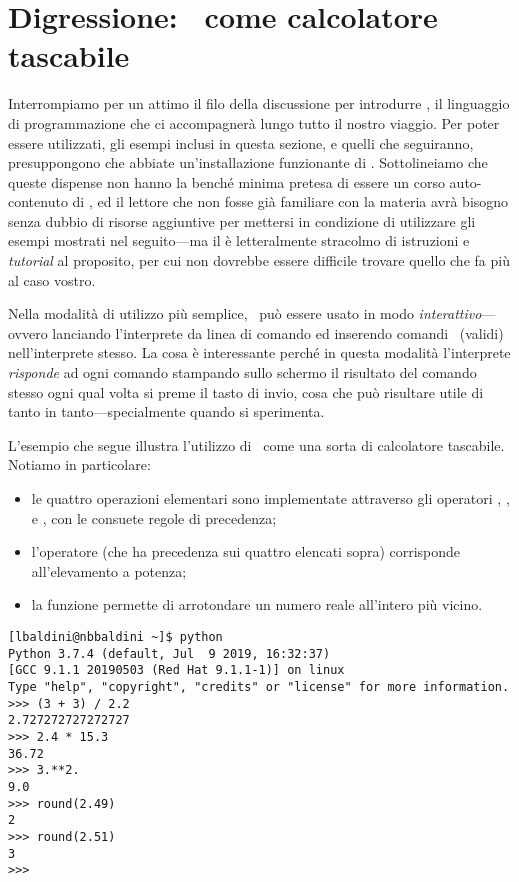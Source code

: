 \section{Digressione: \python\ come calcolatore tascabile}

Interrompiamo per un attimo il filo della discussione per introdurre \python,
il linguaggio di programmazione che ci accompagnerà lungo tutto il nostro
viaggio. Per poter essere utilizzati, gli esempi inclusi in questa sezione, e
quelli che seguiranno, presuppongono che abbiate un'installazione funzionante
di \python. Sottolineiamo che queste dispense non hanno la benché minima pretesa
di essere un corso auto-contenuto di \python, ed il lettore che non fosse già
familiare con la materia avrà bisogno senza dubbio di risorse aggiuntive per
mettersi in condizione di utilizzare gli esempi mostrati nel seguito---ma il
 è letteralmente stracolmo di istruzioni e \emph{tutorial} al
proposito, per cui non dovrebbe essere difficile trovare quello che fa più al
caso vostro.

Nella modalità di utilizzo più semplice, \python\ può essere usato in modo
\emph{interattivo}---ovvero lanciando l'interprete da linea di comando ed
inserendo comandi \python\ (validi) nell'interprete stesso. La cosa è
interessante perché in questa modalità l'interprete \emph{risponde} ad
ogni comando stampando sullo schermo il risultato del comando stesso ogni qual
volta si preme il tasto di invio, cosa che può risultare utile di tanto in
tanto---specialmente quando si sperimenta.

L'esempio che segue illustra l'utilizzo di \python\ come una sorta di calcolatore
tascabile. Notiamo in particolare:
\begin{itemize}
\item le quattro operazioni elementari sono implementate attraverso gli
  operatori \cchar{+}, \cchar{-}, \cchar{*} e \cchar{/}, con le consuete regole
  di precedenza;
\item l'operatore \cchar{**} (che ha precedenza sui quattro elencati sopra)
  corrisponde all'elevamento a potenza;
\item la funzione  permette di arrotondare un numero reale
  all'intero più vicino.
\end{itemize}

\begin{Verbatim}
[lbaldini@nbbaldini ~]$ python
Python 3.7.4 (default, Jul  9 2019, 16:32:37)
[GCC 9.1.1 20190503 (Red Hat 9.1.1-1)] on linux
Type "help", "copyright", "credits" or "license" for more information.
>>> (3 + 3) / 2.2
2.727272727272727
>>> 2.4 * 15.3
36.72
>>> 3.**2.
9.0
>>> round(2.49)
2
>>> round(2.51)
3
>>>
\end{Verbatim}

